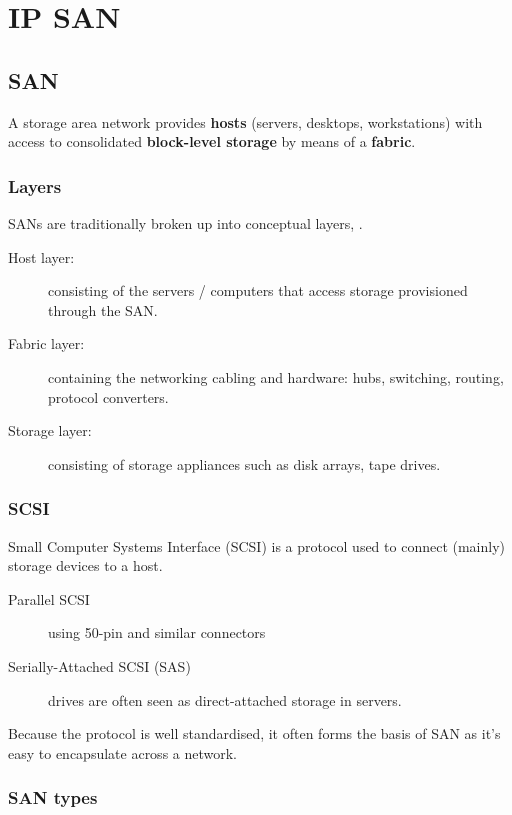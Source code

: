 \chapter{IP SAN}
\label{ch:ip-san}

\section{SAN}\label{san}

A storage area network provides \textbf{hosts} (servers, desktops,
workstations) with access to consolidated \textbf{block-level storage}
by means of a \textbf{fabric}.

\subsection{Layers}\label{layers}

SANs are traditionally broken up into conceptual layers, .

\begin{description}
\item[Host layer:]
consisting of the servers / computers that access storage provisioned
through the SAN.
\item[Fabric layer:]
containing the networking cabling and hardware: hubs, switching,
routing, protocol converters.
\item[Storage layer:]
consisting of storage appliances such as disk arrays, tape drives.
\end{description}

\subsection{SCSI}\label{scsi}

Small Computer Systems Interface (SCSI) is a protocol used to connect
(mainly) storage devices to a host.

\begin{description}
\item[Parallel SCSI]
using 50-pin and similar connectors
\item[Serially-Attached SCSI (SAS)]
drives are often seen as direct-attached storage in servers.
\end{description}

Because the protocol is well standardised, it often forms the basis of
SAN as it's easy to encapsulate across a network.

\subsection{SAN types}\label{san-types}

